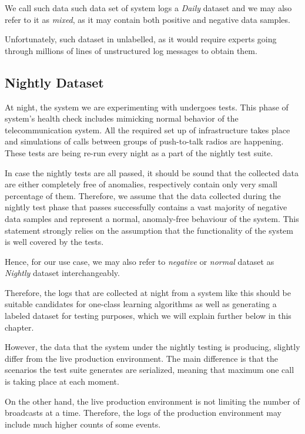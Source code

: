 We call such data such data set of system logs a \textit{Daily} dataset and we may also refer to it as \textit{mixed}, as it may contain both positive and negative data samples. 

Unfortunately, such dataset in unlabelled, as it would require experts going through millions of lines of unstructured log messages to obtain them. 

\subsection{Nightly Dataset}
At night, the system we are experimenting with undergoes tests. This phase of system's health check includes mimicking normal behavior of the telecommunication system. All the required set up of infrastructure takes place and simulations of calls between groups of push-to-talk radios are happening. These tests are being re-run every night as a part of the nightly test suite. 

In case the nightly tests are all passed, it should be sound that the collected data are either completely free of anomalies, respectively contain only very small percentage of them. Therefore, we assume that the data collected during the nightly test phase that passes successfully contains a vast majority of negative data samples and represent a normal, anomaly-free behaviour of the system. This statement strongly relies on the assumption that the functionality of the system is well covered by the tests. 

Hence, for our use case, we may also refer to \textit{negative} or \textit{normal} dataset as \textit{Nightly} dataset interchangeably.

Therefore, the logs that are collected at night from a system like this should be suitable candidates for one-class learning algorithms as well as generating a labeled dataset for testing purposes, which we will explain further below in this chapter.

However, the data that the system under the nightly testing is producing, slightly differ from the live production environment. The main difference is that the scenarios the test suite generates are serialized, meaning that maximum one call is taking place at each moment. 

On the other hand, the live production environment is not limiting the number of broadcasts at a time. Therefore, the logs of the production environment may include much higher counts of some events. 

